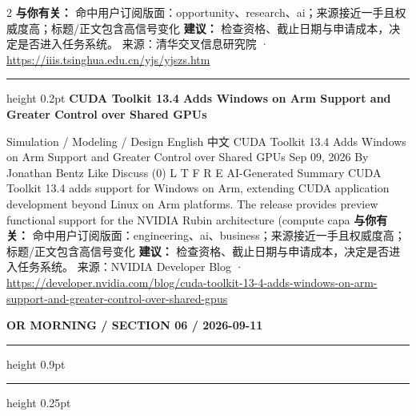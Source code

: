 \documentclass[10.5pt]{ctexart}
\begin{document}
\begin{multicols}{2}
\textbf{与你有关：} 命中用户订阅版面：opportunity、research、ai；来源接近一手且权威度高；标题/正文包含高信号变化
\textbf{建议：} 检查资格、截止日期与申请成本，决定是否进入任务系统。
{\footnotesize\color{ormuted} 来源：清华交叉信息研究院 · \url{https://iiis.tsinghua.edu.cn/yjs/yjszs.htm}}
\vspace{2mm}
\hrule height 0.2pt
\vspace{2mm}
{\large\bfseries CUDA Toolkit 13.4 Adds Windows on Arm Support and Greater Control over Shared GPUs}\par
Simulation / Modeling / Design English 中文 CUDA Toolkit 13.4 Adds Windows on Arm Support and Greater Control over Shared GPUs Sep 09, 2026 By Jonathan Bentz Like Discuss (0) L T F R E AI-Generated Summary CUDA Toolkit 13.4 adds support for Windows on Arm, extending CUDA application development beyond Linux on Arm platforms. The release provides preview functional support for the NVIDIA Rubin architecture (compute capa
\textbf{与你有关：} 命中用户订阅版面：engineering、ai、business；来源接近一手且权威度高；标题/正文包含高信号变化
\textbf{建议：} 检查资格、截止日期与申请成本，决定是否进入任务系统。
{\footnotesize\color{ormuted} 来源：NVIDIA Developer Blog · \url{https://developer.nvidia.com/blog/cuda-toolkit-13-4-adds-windows-on-arm-support-and-greater-control-over-shared-gpus}}
\end{multicols}
\newpage
{\small\bfseries OR MORNING / SECTION 06 / 2026-09-11}
\vspace{2mm}
\hrule height 0.9pt
\vspace{1.5mm}
\hrule height 0.25pt
\vspace{4mm}
\end{document}
